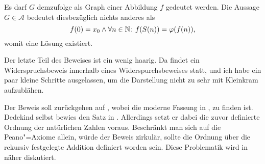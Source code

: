 \begin{Beweis}[Beweis]
Es darf $G$ demzufolge als Graph einer Abbildung $f$ gedeutet werden.
Die Aussage $G\in\mathcal A$ bedeutet diesbezüglich nichts anderes als
\[f(0)=x_0\land\forall n\in\mathbb N\colon f(S(n))=\varphi(f(n)),\]
womit eine Lösung existiert.\,\qedsymbol
\end{Beweis}

\noindent
Der letzte Teil des Beweises ist ein wenig haarig. Da findet ein
Widerspruchsbeweis innerhalb eines Widerspurchsbeweises statt,
und ich habe ein paar kleine Schritte ausgelassen, um die Darstellung
nicht zu sehr mit Kleinkram aufzublähen.

Der Beweis soll zurückgehen auf \cite{Lorenzen}, wobei die moderne
Fassung in \cite{Halmos}, \cite{Mainzer} zu finden ist.
Dedekind selbst bewies den Satz in \cite{Stach}. Allerdings setzt
er dabei die zuvor definierte Ordnung der natürlichen Zahlen
voraus. Beschränkt man sich auf die Peano"=Axiome allein, würde
der Beweis zirkulär, sollte die Ordnung über die rekursiv festgelegte
Addition definiert worden sein. Diese Problematik wird in \cite{Lamm}
näher diskutiert.


